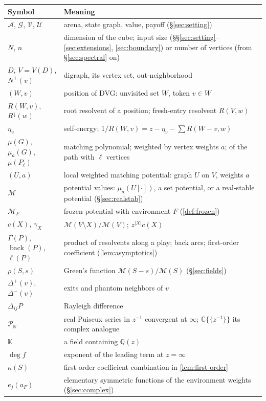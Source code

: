 \documentclass[final]{siamart0516}
\numberwithin{theorem}{section}
\numberwithin{equation}{section}
\theoremstyle{siamnonum}
\theoremstyle{plain}
\newcommand{\QQ}{\mathbb{Q}}
\newcommand{\RR}{\mathbb{R}}
\newcommand{\CC}{\mathbb{C}}
\newcommand{\Qz}{\QQ(z)}
\newcommand{\Puis}{\mathcal{P}_{\RR}}
\newcommand{\val}{\mathcal{V}}            %
\newcommand{\pay}{\mathcal{U}}            %
\newcommand{\SG}{\mathcal{G}}             %
\newcommand{\arena}{\mathcal{A}}          %
\newcommand{\Mpot}{\mathcal{M}}           %
\newcommand{\back}{\operatorname{back}}
\newcommand{\Rdown}{R^{\downarrow}}
\newcommand{\nplus}{N^{+}}
\begin{document}
\begin{center}\small
\begin{longtable}{@{}L{0.25}L{0.71}@{}}
\toprule
Symbol & Meaning\\ \midrule\endhead
$\arena$, $\SG$, $\val$, $\pay$ & arena, state graph, value, payoff (\S\ref{sec:setting})\\
$N$, $n$ & dimension of the cube; input size (\S\S\ref{sec:setting}--\ref{sec:extensions}, \ref{sec:boundary}) or number of vertices (from \S\ref{sec:spectral} on)\\
$D$, $V=V(D)$, $\nplus(v)$ & digraph, its vertex set, out-neighborhood\\
$(W,v)$ & position of DVG: unvisited set $W$, token $v\in W$\\
$R(W,v)$, $\Rdown(w)$ & root resolvent of a position; fresh-entry resolvent $R(V,w)$\\
$\eta_v$ & self-energy; $1/R(W,v)=z-\eta_v-\sum R(W-v,w)$\\
$\mu(G)$, $\mu_a(G)$, $\mu(P_\ell)$ & matching polynomial; weighted by vertex weights $a$; of the path with $\ell$ vertices\\
$(U,a)$ & local weighted matching potential: graph $U$ on $V$, weights $a$\\
$\Mpot$ & potential values: $\mu_a(U[\cdot])$, a set potential, or a real-stable potential (\S\ref{sec:realstab})\\
$\Mpot_F$ & frozen potential with environment $F$ (\cref{def:frozen})\\
$c(X)$, $\gamma_X$ & $\Mpot(V\setminus X)/\Mpot(V)$; $z^{|X|}c(X)$\\
$\Gamma(P)$, $\back(P)$, $\ell(P)$ & product of resolvents along a play; back arcs; first-order coefficient (\cref{lem:asymptotics})\\
$\rho(S,s)$ & Green's function $\Mpot(S-s)/\Mpot(S)$ (\S\ref{sec:fields})\\
$\Delta^{+}(v)$, $\Delta^{-}(v)$ & exits and phantom neighbors of $v$\\
$\Delta_{ij}P$ & Rayleigh difference\\
$\Puis$ & real Puiseux series in $z^{-1}$ convergent at $\infty$; $\CC\{\!\{z^{-1}\}\!\}$ its complex analogue\\
$\mathbb K$ & a field containing $\Qz$\\
$\deg f$ & exponent of the leading term at $z=\infty$\\
$\kappa(S)$ & first-order coefficient combination in \cref{lem:first-order}\\
$e_j(a_F)$ & elementary symmetric functions of the environment weights (\S\ref{sec:complex})\\

\end{longtable}
\end{center}
\end{document}

